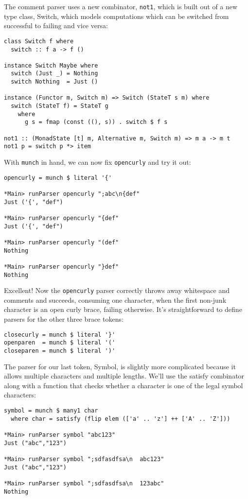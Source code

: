 \documentclass{tmr}
\begin{document}
The comment parser uses a new combinator, \verb+not1+, which is built out of a 
new type class, Switch, which models computations which can be switched from
successful to failing and vice versa:
\begin{verbatim}
class Switch f where
  switch :: f a -> f ()

instance Switch Maybe where
  switch (Just _) = Nothing
  switch Nothing  = Just ()

instance (Functor m, Switch m) => Switch (StateT s m) where
  switch (StateT f) = StateT g
    where 
      g s = fmap (const ((), s)) . switch $ f s

not1 :: (MonadState [t] m, Alternative m, Switch m) => m a -> m t
not1 p = switch p *> item
\end{verbatim}

With \verb+munch+ in hand, we can now fix \verb+opencurly+ and try it out:
\begin{verbatim}
opencurly = munch $ literal '{'

*Main> runParser opencurly ";abc\n{def"
Just ('{', "def")

*Main> runParser opencurly "{def"
Just ('{', "def")

*Main> runParser opencurly "(def"
Nothing

*Main> runParser opencurly "}def"
Nothing
\end{verbatim}

Excellent!  Now the \verb+opencurly+ parser correctly throws away whitespace 
and comments and succeeds, consuming one character, when the first non-junk 
character is an open curly brace, failing otherwise.
It's straightforward to define parsers for the other three brace tokens:
\begin{verbatim}
closecurly = munch $ literal '}'
openparen  = munch $ literal '('
closeparen = munch $ literal ')'
\end{verbatim}

The parser for our last token, Symbol, is slightly more complicated because it allows
multiple characters and multiple lengths.  We'll use the satisfy combinator along with 
a function that checks whether a character is one of the legal symbol characters:
\begin{verbatim}
symbol = munch $ many1 char
  where char = satisfy (flip elem (['a' .. 'z'] ++ ['A' .. 'Z']))

*Main> runParser symbol "abc123"
Just ("abc","123")

*Main> runParser symbol ";sdfasdfsa\n  abc123"
Just ("abc","123")

*Main> runParser symbol ";sdfasdfsa\n  123abc"
Nothing
\end{verbatim}
\end{document}
